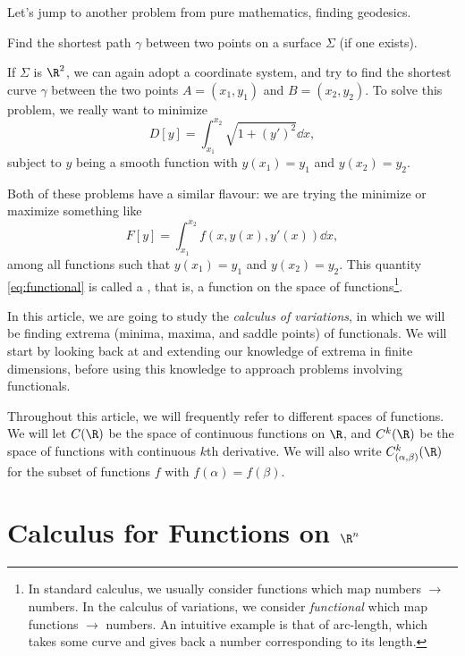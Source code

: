 \documentclass[a4paper]{scrartcl}
\begin{document}
Let's jump to another problem from pure mathematics, finding geodesics.

\begin{example}
	Find the shortest path $\gamma$ between two points on a surface $\Sigma$ (if one exists).
\end{example}


If $\Sigma$ is $\R^2$, we can again adopt a coordinate system, and try to find the shortest curve $\gamma$ between the two points $A = (x_1, y_1)$ and $B=(x_2, y_2)$.
To solve this problem, we really want to minimize
$$
D[y] = \int_{x_1}^{x_2} \sqrt{1 + (y')^2} \dd{x},
$$
subject to $y$ being a smooth function with $y(x_1) = y_1$ and $y(x_2) = y_2$.

Both of these problems have a similar flavour: we are trying the minimize or maximize something like
\begin{equation}\label{eq:functional}
	F[y] = \int_{x_1}^{x_2} f(x, y(x), y'(x)) \dd x, \tag{$*$}
\end{equation}
among all functions such that $y(x_1) = y_1$ and $y(x_2) = y_2$.
This quantity \eqref{eq:functional} is called a , that is, a function on the space of functions\footnote{In standard calculus, we usually consider functions which map numbers $\rightarrow$ numbers. In the calculus of variations, we consider \emph{functional} which map functions $\rightarrow$ numbers. An intuitive example is that of arc-length, which takes some curve and gives back a number corresponding to its length.}.

In this article, we are going to study the \emph{calculus of variations}, in which we will be finding extrema (minima, maxima, and saddle points) of functionals. 
We will start by looking back at and extending our knowledge of extrema in finite dimensions, before using this knowledge to approach problems involving functionals.

\begin{notation}
	Throughout this article, we will frequently refer to different spaces of functions. We will let $C(\R)$ be the space of continuous functions on $\R$, and $C^k(\R)$ be the space of functions with continuous $k$th derivative. We will also write $C_{(\alpha, \beta)}^k(\R)$ for the subset of functions $f$ with $f(\alpha) = f(\beta)$.
\end{notation}


\section{Calculus for Functions on \texorpdfstring{$\R^n$}{R-n}}
\end{document}
